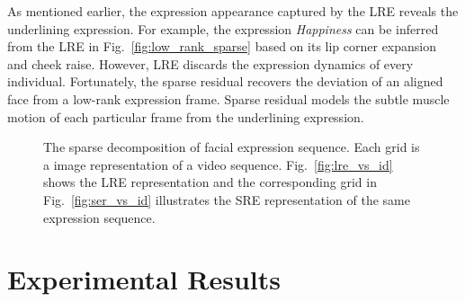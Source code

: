 \documentclass[journal]{IEEEtran}
\begin{document}
As mentioned earlier, the expression appearance captured by the LRE reveals the underlining expression. For example, the expression \textit{Happiness} can be inferred from the LRE in Fig.~\ref{fig:low_rank_sparse} based on its lip corner expansion and cheek raise. However, LRE discards the expression dynamics of every individual. Fortunately, the sparse residual recovers the deviation of an aligned face from a low-rank expression frame. Sparse residual models the subtle muscle motion of each particular frame from the underlining expression. 

\begin{figure}[htbp]
\caption{\label{fig:rep_vs_id} The sparse decomposition of facial expression sequence. Each grid is a image representation of a video sequence. Fig.~\ref{fig:lre_vs_id} shows the LRE representation and the corresponding grid in Fig.~\ref{fig:ser_vs_id} illustrates the SRE representation of the same expression sequence.}
\end{figure}

\section{Experimental Results\label{sec:exp}}
\end{document}
